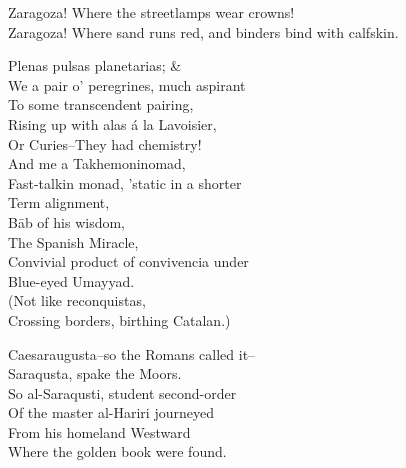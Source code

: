 Zaragoza! Where the streetlamps wear crowns! \\
Zaragoza! Where sand runs red, and binders bind with calfskin. 

Plenas pulsas planetarias; \& \\
We a pair o' peregrines, much aspirant \\
To some transcendent pairing, \\
Rising up with alas á la Lavoisier, \\
Or Curies--They had chemistry! \\

And me a Takhemoninomad, \\
\quad Fast-talkin monad, 'static in a shorter \\
\qquad Term alignment, \\
Bāb of his wisdom, \\
\quad The Spanish Miracle, \\
\qquad Convivial product of convivencia under \\
Blue-eyed Umayyad. \\
(Not like reconquistas, \\
Crossing borders, birthing Catalan.)

Caesaraugusta--so the Romans called it-- \\
Saraqusta, spake the Moors. \\
So al-Saraqusti, student second-order \\
Of the master al-Hariri journeyed \\
From his homeland Westward \\
Where the golden book were found.